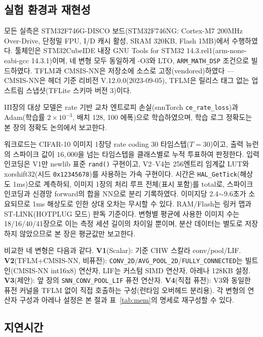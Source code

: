 \label{sec:eval}

\subsection{실험 환경과 재현성}

모든 실측은 STM32F746G-DISCO 보드(STM32F746NG: Cortex-M7 200MHz
Over-Drive, 단정밀 FPU, I/D 캐시 활성, SRAM 320KB, Flash
1MB)\cite{st_rm0385}에서 수행하였다. 툴체인은 STM32CubeIDE 내장 GNU
Tools for STM32 14.3.rel1(arm-none-eabi-gcc 14.3.1)이며, 네 변형 모두
동일하게 -O3와 LTO, \texttt{ARM\_MATH\_DSP} 조건으로 빌드하였다.
TFLM과 CMSIS-NN은 저장소에 소스로 고정(vendored)하였다 ---
CMSIS-NN은 헤더 기준 리비전 V.12.0.0(2023-09-05), TFLM은 릴리스
태그 없는 업스트림 스냅샷(TFLite 스키마 버전 3)이다.

III장의 대상 모델은 rate 기반 교차 엔트로피 손실(snnTorch
\texttt{ce\_rate\_loss})과 Adam(학습률 $2\times10^{-3}$, 배치 128,
100 에폭)으로 학습하였으며, 학습 로그 정확도는 본 장의 정확도 논의에서
보고한다.

워크로드는 CIFAR-10\cite{krizhevsky2009cifar} 이미지 1장당 rate coding
30 타임스텝($T=30$)이고, 출력 뉴런의 스파이크 값이 $16{,}000$을 넘는
타임스텝을 클래스별로 누적 투표하여 판정한다. 입력 인코딩은 V1만
newlib 표준 \texttt{rand()} 구현이고, V2--V4는 256엔트리 임계값
LUT와 xorshift32(시드 \texttt{0x12345678})를 사용하는 가속 구현이다.
시간은 \texttt{HAL\_GetTick}(해상도 1ms)으로 계측하되, 이미지 1장의
처리 루프 전체(표시 포함)를 total로, 스파이크 인코딩과 신경망 forward의
합을 NN으로 분리 기록하였다. 이미지당 2.4$\sim$9.6초가 소요되므로 1ms
해상도로 인한 상대 오차는 무시할 수 있다. RAM/Flash는 링커 맵과
ST-LINK(HOTPLUG 모드) 판독 기준이다. 변형별 평균에 사용한 이미지 수는
18/16/40/41장으로 이는 측정 세션 길이의 차이일 뿐이며, 분산 데이터는
별도로 저장하지 않았으므로 본 장은 평균값만 보고한다.

비교한 네 변형은 다음과 같다. \textbf{V1}(Scalar): 기준 CHW 스칼라
conv/pool/LIF. \textbf{V2}(TFLM+CMSIS-NN, 비퓨전):
\texttt{CONV\_2D}/\texttt{AVG\_POOL\_2D}/\texttt{FULLY\_CONNECTED}는
빌트인(CMSIS-NN int16x8) 연산자, LIF는 커스텀 SIMD 연산자, 아레나
128KB 설정. \textbf{V3}(제안): 앞 장의 \texttt{SNN\_CONV\_POOL\_LIF}
퓨전 연산자. \textbf{V4}(직접 퓨전): V3와 동일한 퓨전 커널을 TFLM 없이
직접 호출하는 구성(런타임 오버헤드 분리용). 각 변형의 연산자 구성과
아레나 설정은 본 절과 표~\ref{tab:mem}의 명세로 재구성할 수 있다.

\subsection{지연시간}

